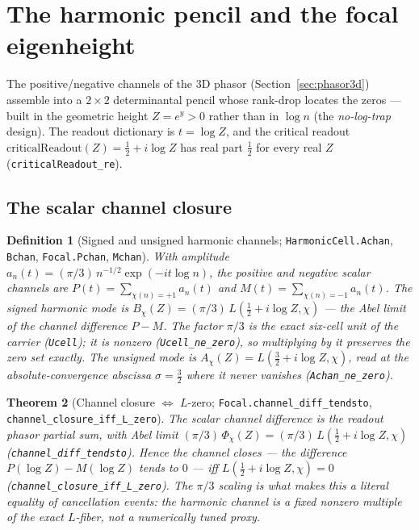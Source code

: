 \documentclass[11pt]{article}
\newtheorem{definition}{Definition}[section]
\newtheorem{theorem}[definition]{Theorem}
\newcommand{\code}[1]{\texttt{#1}}
\begin{document}
\section{The harmonic pencil and the focal eigenheight}\label{sec:pencil}

The positive/negative channels of the 3D phasor (Section~\ref{sec:phasor3d}) assemble into a
$2\times2$ determinantal pencil whose rank-drop locates the zeros --- built in the geometric height
$Z=e^{y}>0$ rather than in $\log n$ (the \emph{no-log-trap} design). The readout dictionary is
$t=\log Z$, and the critical readout $\mathrm{criticalReadout}(Z)=\tfrac12+i\log Z$ has real part
$\tfrac12$ for every real $Z$ (\code{criticalReadout\_re}).

\subsection{The scalar channel closure}

\begin{definition}[Signed and unsigned harmonic channels; \code{HarmonicCell.Achan}, \code{Bchan}, \code{Focal.Pchan}, \code{Mchan}]\label{def:channels}
With amplitude $a_n(t)=(\pi/3)\,n^{-1/2}\exp(-it\log n)$, the positive and negative scalar channels
are $P(t)=\sum_{\chi(n)=+1}a_n(t)$ and $M(t)=\sum_{\chi(n)=-1}a_n(t)$. The \emph{signed} harmonic mode
is $B_\chi(Z)=(\pi/3)\,L(\tfrac12+i\log Z,\chi)$ --- the Abel limit of the channel difference $P-M$.
The factor $\pi/3$ is the exact six-cell unit of the carrier (\code{Ucell}); it is nonzero
(\code{Ucell\_ne\_zero}), so multiplying by it preserves the zero set exactly.  The \emph{unsigned}
mode is $A_\chi(Z)=L(\tfrac32+i\log Z,\chi)$, read at the absolute-convergence abscissa
$\sigma=\tfrac32$ where it never vanishes (\code{Achan\_ne\_zero}).
\end{definition}

\begin{theorem}[Channel closure $\iff$ $L$-zero; \code{Focal.channel\_diff\_tendsto}, \code{channel\_closure\_iff\_L\_zero}]\label{thm:channelclosure}
The scalar channel difference is the readout phasor partial sum, with Abel limit
$(\pi/3)\,\Phi_\chi(Z)=(\pi/3)\,L(\tfrac12+i\log Z,\chi)$ (\code{channel\_diff\_tendsto}). Hence the
channel closes --- the difference $P(\log Z)-M(\log Z)$ tends to $0$ --- \emph{iff}
$L(\tfrac12+i\log Z,\chi)=0$ (\code{channel\_closure\_iff\_L\_zero}).  The $\pi/3$ scaling is what
makes this a literal equality of cancellation events: the harmonic channel is a fixed nonzero
multiple of the exact $L$-fiber, not a numerically tuned proxy.
\end{theorem}
\end{document}
